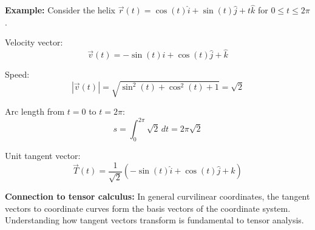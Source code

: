 \textbf{Example:} Consider the helix $\vec{r}(t) = \cos(t)\hat{i} + \sin(t)\hat{j} + t\hat{k}$ for $0 \leq t \leq 2\pi$.

Velocity vector:
\[
\vec{v}(t) = -\sin(t)\hat{i} + \cos(t)\hat{j} + \hat{k}
\]

Speed:
\[
|\vec{v}(t)| = \sqrt{\sin^2(t) + \cos^2(t) + 1} = \sqrt{2}
\]

Arc length from $t = 0$ to $t = 2\pi$:
\[
s = \int_0^{2\pi} \sqrt{2} \, dt = 2\pi\sqrt{2}
\]

Unit tangent vector:
\[
\vec{T}(t) = \frac{1}{\sqrt{2}}\left(-\sin(t)\hat{i} + \cos(t)\hat{j} + \hat{k}\right)
\]

\textbf{Connection to tensor calculus:} In general curvilinear coordinates, the tangent vectors to coordinate curves form the basis vectors of the coordinate system. Understanding how tangent vectors transform is fundamental to tensor analysis.

